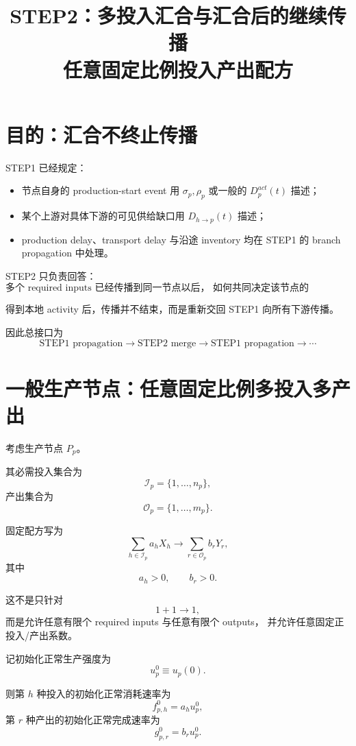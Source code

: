 \documentclass[UTF8,11pt]{ctexart}
\title{STEP2：多投入汇合与汇合后的继续传播\\
任意固定比例投入产出配方}
\author{}
\date{}
\begin{document}
\maketitle

\section{目的：汇合不终止传播}

STEP1 已经规定：

\begin{itemize}
    \item 节点自身的 production-start event 用
    \(\sigma_p,\rho_p\) 或一般的 \(D_p^{act}(t)\) 描述；
    \item 某个上游对具体下游的可见供给缺口用
    \(D_{h\to p}(t)\) 描述；
    \item production delay、transport delay 与沿途 inventory
    均在 STEP1 的 branch propagation 中处理。
\end{itemize}

STEP2 只负责回答：
\[
\boxed{
\text{多个 required inputs 已经传播到同一节点以后，
如何共同决定该节点的 production-start activity？}
}
\]

得到本地 activity 后，传播并不结束，而是重新交回 STEP1 向所有下游传播。

因此总接口为
\[
\boxed{
\text{STEP1 propagation}
\rightarrow
\text{STEP2 merge}
\rightarrow
\text{STEP1 propagation}
\rightarrow\cdots
}
\tag{1}
\]

\section{一般生产节点：任意固定比例多投入多产出}

考虑生产节点 \(P_p\)。

其必需投入集合为
\[
\mathcal I_p=\{1,\ldots,n_p\},
\]
产出集合为
\[
\mathcal O_p=\{1,\ldots,m_p\}.
\]

固定配方写为
\[
\boxed{
\sum_{h\in\mathcal I_p}a_hX_h
\longrightarrow
\sum_{r\in\mathcal O_p}b_rY_r,
}
\tag{2}
\]
其中
\[
a_h>0,
\qquad
b_r>0.
\]

这不是只针对
\[
1+1\to1,
\]
而是允许任意有限个 required inputs 与任意有限个 outputs，
并允许任意固定正投入/产出系数。

记初始化正常生产强度为
\[
\boxed{
u_p^0\equiv u_p(0).
}
\]

则第 \(h\) 种投入的初始化正常消耗速率为
\[
\boxed{
f_{p,h}^0=a_hu_p^0,
}
\tag{3}
\]
第 \(r\) 种产出的初始化正常完成速率为
\[
\boxed{
g_{p,r}^0=b_ru_p^0.
}
\tag{4}
\]
\end{document}
